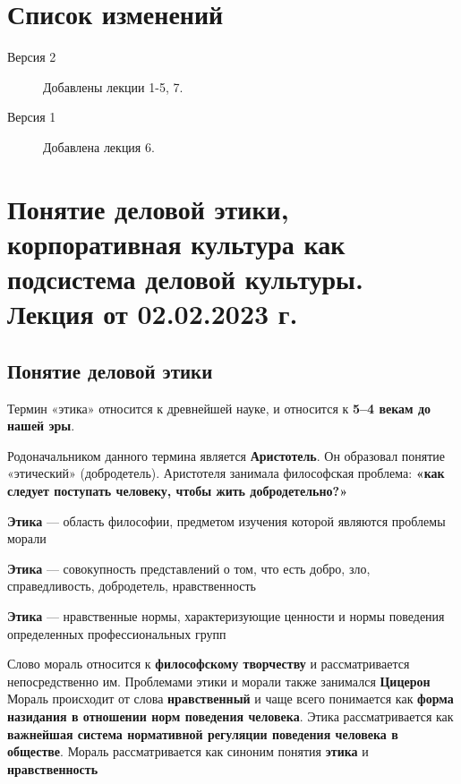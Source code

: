 \section*{Список изменений}
\begin{description}
    \item[Версия 2] Добавлены лекции 1-5, 7.
    \item[Версия 1] Добавлена лекция 6. 
\end{description}

\clearpage

\tableofcontents
\clearpage

\section{Понятие деловой этики, корпоративная культура как подсистема деловой культуры. Лекция от 02.02.2023 г.}

\subsection{Понятие деловой этики}

Термин «этика» относится к древнейшей науке, и относится к \textbf{5–4 векам до нашей эры}.

Родоначальником данного термина является \textbf{Аристотель}. Он образовал понятие «этический» (добродетель). Аристотеля занимала философская проблема: \textbf{«как следует поступать человеку, чтобы жить добродетельно?»}

\begin{definition}
\textbf{Этика} — область философии, предметом изучения которой являются проблемы морали

\textbf{Этика} — совокупность представлений о том, что есть добро, зло, справедливость, добродетель, нравственность

\textbf{Этика} — нравственные нормы, характеризующие ценности и нормы поведения определенных профессиональных групп
\end{definition}

Слово мораль относится к \textbf{философскому творчеству} и рассматривается непосредственно им. Проблемами этики и морали также занимался \textbf{Цицерон} Мораль происходит от слова \textbf{нравственный} и чаще всего понимается как \textbf{форма назидания в отношении норм поведения человека}. Этика рассматривается как \textbf{важнейшая система нормативной регуляции поведения человека в обществе}. Мораль рассматривается как синоним понятия \textbf{этика} и \textbf{нравственность}

